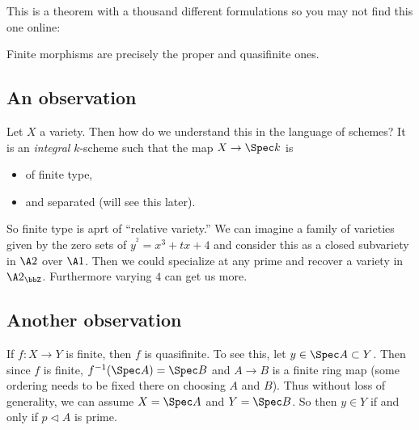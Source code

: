 \documentclass[12pt]{article}
\begin{document}
This is a theorem with a thousand different formulations so you may not find this one online:
\begin{thm}
	Finite morphisms are precisely the proper and quasifinite ones.
\end{thm}

\subsection{An observation}
Let $X$ a variety. Then how do we understand this in the language of schemes? It is an \textit{integral} $k$-scheme such that the map 
$X\to \Spec k$ is
\begin{itemize}
	\item of finite type,
	\item and separated (will see this later).
\end{itemize}
So finite type is aprt of ``relative variety.'' We can imagine a family of varieties given by the zero sets 
of $y^^2=x^3+tx+4$ and consider this as a closed subvariety in $\A 2$ over $\A1$. Then we could specialize at any prime and recover a variety in $\A2_\bbZ$.
Furthermore varying $4$ can get us more.

\subsection{Another observation}
If $f:X\to Y$ is finite, then $f$ is quasifinite. To see this, let $y\in \Spec A\subset Y$. Then since $f$ is finite,
$f^{-1}(\Spec A)=\Spec B$ and $A\to B$ is a finite ring map (some ordering needs to be fixed there on choosing $A$ and $B$).
Thus without loss of generality, we can assume $X=\Spec A$ and $Y=\Spec B$. So then $y\in Y$ if and only if $p\lhd A$ is prime.
\end{document}
